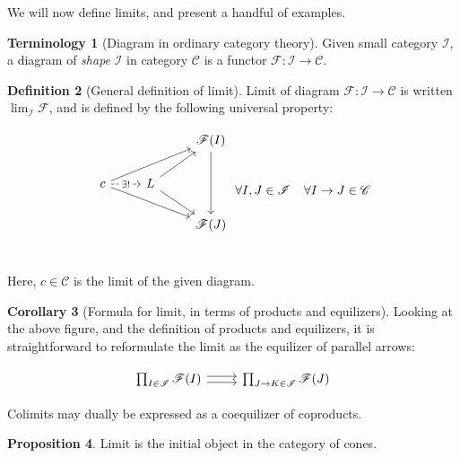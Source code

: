 \documentclass[10pt]{amsart}
\newcommand{\8}{\ensuremath{\infty}}
\newcommand{\0}{\ensuremath{\overset{\rightarrow}{0}}}
\newcommand{\1}{\ensuremath{\mathbf{1}}}
\newcommand{\C}{\ensuremath{\mathscr{C}}}
\newcommand{\F}{\ensuremath{\mathscr{F}}}
\newcommand{\I}{\ensuremath{\mathscr{I}}}
\theoremstyle{definition}
\newtheorem{definition}{Definition}[section]
\newtheorem{terminology}[definition]{Terminology}
\newtheorem{proposition}[definition]{Proposition}
\newtheorem{corollary}[definition]{Corollary}
\numberwithin{definition}{subsection}
\numberwithin{definition}{section}
\begin{document}
We will now define limits, and present a handful of examples.

\begin{terminology}[Diagram in ordinary category theory\label{not:diacat}]
  Given small category $\I$, a diagram of \emph{shape} $\I$ in category $\C$ is a functor $\F: \I \rightarrow \C$.
\end{terminology}

\begin{definition}[General definition of limit]
  Limit of diagram $\F : \I \rightarrow \C$ is written $\lim_{\I} \F$, and is defined by the following universal property:

  \begin{equation*}
    \begin{tikzcd}
      & & \F(I) \arrow[dd] \\
      c \arrow[r, dashed, "\exists!" description] \arrow[urr] \arrow[drr] & L \arrow[ur] \arrow[dr] & \\
      & & \F(J) \\
    \end{tikzcd} \; \forall I, J \in \I \;\;\;\; \forall I \rightarrow J \in \C
  \end{equation*}

  Here, $c \in \C$ is the limit of the given diagram.
\end{definition}

\begin{corollary}[Formula for limit, in terms of products and equilizers\label{cor:limformula}]
  Looking at the above figure, and the definition of products and equilizers, it is straightforward to reformulate the limit as the equilizer of parallel arrows:

  \begin{equation*}
    \begin{tikzcd}
      \prod_{I \in \I} \F(I) \arrow[r, shift left] \arrow[r, shift right] & \prod_{J \rightarrow K \in \I} \F(J)
    \end{tikzcd}
  \end{equation*}

  Colimits may dually be expressed as a coequilizer of coproducts.
\end{corollary}

\begin{proposition}
  Limit is the initial object in the category of cones.
\end{proposition}
\end{document}

